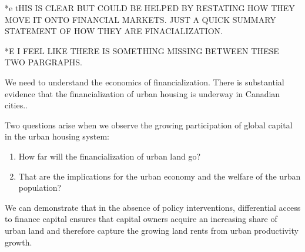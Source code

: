 
*e tHIS IS CLEAR BUT COULD BE HELPED BY RESTATING HOW THEY MOVE IT ONTO FINANCIAL MARKETS. JUST A QUICK SUMMARY STATEMENT OF HOW THEY ARE FINACIALIZATION. %

*E I FEEL LIKE THERE IS SOMETHING MISSING BETWEEN THESE TWO PARGRAPHS. %

We need to understand the economics of financialization.
There is substantial evidence that the financialization of urban housing is underway in Canadian cities..

Two questions arise when we observe the growing participation of global capital in the urban housing system: 
\begin{enumerate}
\item How far will the financialization of urban land go? 
\item That are the implications for the urban economy and the welfare of the urban population? 
\end{enumerate}

We can demonstrate that in the absence of policy interventions, differential access to finance capital ensures that capital owners acquire an increasing share of urban land %
and therefore capture the growing land rents from urban productivity growth. 

